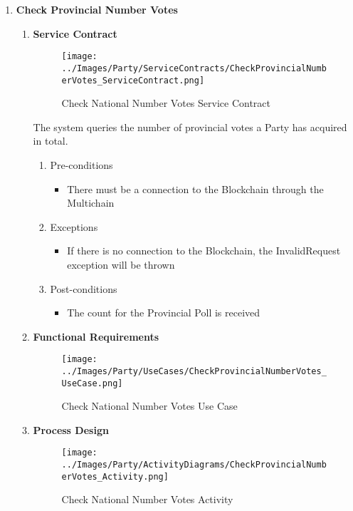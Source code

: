 \begin{enumerate}
\begin{enumerate}
		\end{enumerate}
	
	\item \textbf{Check Provincial Number Votes}
		\begin{enumerate}
			\item \textbf{Service Contract}
			\begin{figure}[H]
				\centering
				\texttt{[image: ../Images/Party/ServiceContracts/CheckProvincialNumberVotes\_ServiceContract.png]}
				\caption{Check National Number Votes Service Contract}
			\end{figure}
			
			The system queries the number of provincial votes a Party has acquired in total.
			\newline
			
			\begin{enumerate}
				\item Pre-conditions
				\begin{itemize}
					\item There must be a connection to the Blockchain through the Multichain
				\end{itemize}
				
				\item Exceptions
				\begin{itemize}
						\item If there is no connection to the Blockchain, the InvalidRequest exception will be thrown
				\end{itemize}
				
				\item Post-conditions
				\begin{itemize}
					\item The count for the Provincial Poll is received
				\end{itemize}
			\end{enumerate}
			
			\item \textbf{Functional Requirements}
			\begin{figure}[H]
				\centering
				\texttt{[image: ../Images/Party/UseCases/CheckProvincialNumberVotes\_UseCase.png]}
				\caption{Check National Number Votes Use Case}
			\end{figure}
						
			\item \textbf{Process Design}
			\begin{figure}[H]
				\centering
				\texttt{[image: ../Images/Party/ActivityDiagrams/CheckProvincialNumberVotes\_Activity.png]}
				\caption{Check National Number Votes Activity}
			\end{figure}
			
		\end{enumerate}
\end{enumerate}